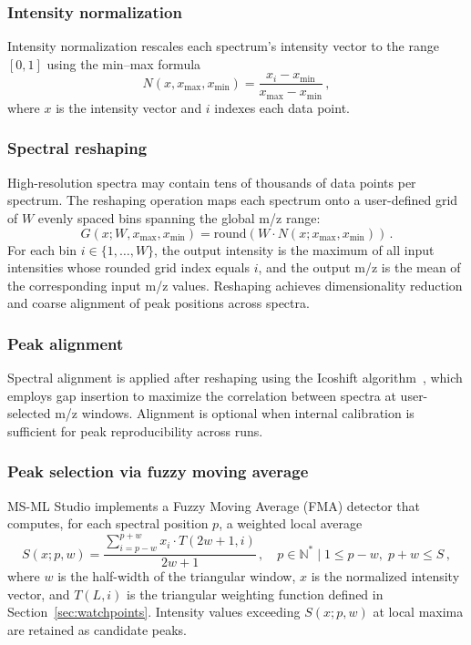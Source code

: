 \documentclass[preprint,12pt]{elsarticle}
\begin{document}
\subsubsection{Intensity normalization}
Intensity normalization rescales each spectrum's intensity vector to the range $[0,1]$ using the min--max formula
\begin{equation}
N(x, x_{\max}, x_{\min}) = \frac{x_i - x_{\min}}{x_{\max} - x_{\min}}\,,
\label{eq:norm}
\end{equation}
where $x$ is the intensity vector and $i$ indexes each data point.

\subsubsection{Spectral reshaping}
High-resolution spectra may contain tens of thousands of data points per spectrum. The reshaping operation maps each spectrum onto a user-defined grid of $W$ evenly spaced bins spanning the global m/z range:
\begin{equation}
G(x; W, x_{\max}, x_{\min}) = \mathrm{round}\left(W \cdot N(x; x_{\max}, x_{\min})\right)\,.
\label{eq:reshape}
\end{equation}
For each bin $i \in \{1,\ldots,W\}$, the output intensity is the maximum of all input intensities whose rounded grid index equals $i$, and the output m/z is the mean of the corresponding input m/z values. Reshaping achieves dimensionality reduction and coarse alignment of peak positions across spectra.

\subsubsection{Peak alignment}
Spectral alignment is applied after reshaping using the Icoshift algorithm~\cite{Tomasi2011}, which employs gap insertion to maximize the correlation between spectra at user-selected m/z windows. Alignment is optional when internal calibration is sufficient for peak reproducibility across runs.

\subsubsection{Peak selection via fuzzy moving average}
MS-ML Studio implements a Fuzzy Moving Average (FMA) detector that computes, for each spectral position $p$, a weighted local average
\begin{equation}
S(x; p, w) = \frac{\sum_{i=p-w}^{p+w} x_i \cdot T(2w+1, i)}{2w+1}\,,\quad p \in \mathbb{N}^{*}\mid 1 \leq p-w,\; p+w \leq S\,,
\label{eq:fma}
\end{equation}
where $w$ is the half-width of the triangular window, $x$ is the normalized intensity vector, and $T(L,i)$ is the triangular weighting function defined in Section~\ref{sec:watchpoints}. Intensity values exceeding $S(x;p,w)$ at local maxima are retained as candidate peaks.
\end{document}
